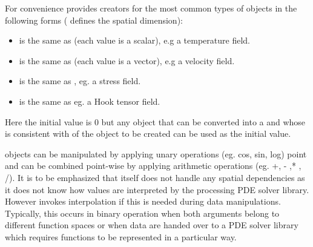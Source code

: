 For convenience \escript provides creators for the most common types
of \Data objects in the following forms ( defines the 
spatial dimension):
\begin{itemize}
\item {} is the same as  (each value is a scalar), 
e.g a temperature field. 
\item {} is the same as  (each value is a vector), e.g
a velocity field.   
\item {} is the same as ,
eg. a stress field.  
\item {} is the same as 
eg. a Hook tensor field.   
\end{itemize}
Here the initial value is $0$ but any object that can be converted into a \numpyNDA and whose \Shape
is consistent with \Shape of the \Data object to be created can be used as the initial value.

\Data objects can be manipulated by applying unary operations (eg. cos, sin, log) point
and can be combined point-wise by applying arithmetic operations (eg. +, - ,* , /). 
It is to be emphasized that \escript itself does not handle any spatial dependencies as 
it does not know how values are interpreted by the processing PDE solver library. 
However \escript invokes interpolation if this is needed during data manipulations. 
Typically, this occurs in binary operation when both arguments belong to different
function spaces or when data are handed over to a PDE solver library 
which requires functions to be represented in a particular way. 

